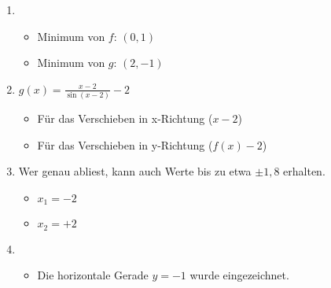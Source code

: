 \item
\begin{enumerate}

\item
\begin{itemize}
\item Minimum von $f$: $(0,1)$ 
\item Minimum von $g$: $(2,-1)$ 
\end{itemize}

\item $g(x) = \frac{x-2}{\sin(x-2)}-2$
\begin{itemize}
\item Für das Verschieben in x-Richtung ($x-2$)
\item Für das Verschieben in y-Richtung ($f(x)-2$)
\end{itemize}

\item Wer genau abliest, kann auch Werte bis zu etwa $\pm 1{,8}$ erhalten.
\begin{itemize}
\item $x_1=-2$
\item $x_2=+2$
\end{itemize}

\item
\begin{itemize}
\item Die horizontale Gerade $y=-1$ wurde eingezeichnet. 
\end{itemize}

\end{enumerate}
